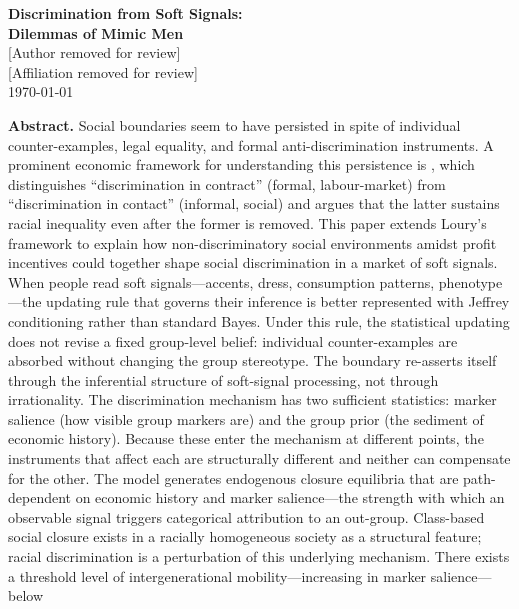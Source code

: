 \documentclass[12pt,a4paper]{article}
\theoremstyle{definition}
\numberwithin{proposition}{subsection}
\begin{document}
\begin{center}
{\LARGE\bfseries Discrimination from Soft Signals:\\[0.4em]
Dilemmas of Mimic Men}\\[1.5em]

{\large [Author removed for review]}\\[0.3em]
{\normalsize [Affiliation removed for review]}\\[1em]

{\normalsize \today}\\[1.5em]

\begin{minipage}{0.85\textwidth}
\small\noindent\textbf{Abstract.}
Social boundaries seem to have persisted in spite of individual
counter-examples, legal equality, and formal anti-discrimination
instruments. A prominent economic framework for understanding this
persistence is \citet{Loury2002}, which distinguishes
``discrimination in contract'' (formal, labour-market) from
``discrimination in contact'' (informal, social) and argues that
the latter sustains racial inequality even after the former is
removed. This paper extends Loury's framework to explain how
non-discriminatory social environments amidst profit incentives
could together shape social discrimination in a market of soft
signals.
When people read soft signals---accents, dress, consumption
patterns, phenotype---the updating rule that governs their
inference is better represented with Jeffrey conditioning rather
than standard Bayes. Under this rule, the statistical updating
does not revise a fixed group-level belief: individual
counter-examples are absorbed without changing the group
stereotype. The boundary re-asserts itself through the inferential
structure of soft-signal processing, not through irrationality.
The discrimination mechanism has two sufficient statistics: marker
salience (how visible group markers are) and the group prior (the
sediment of economic history). Because these enter the mechanism
at different points, the instruments that affect each are
structurally different and neither can compensate for the other.
The model generates endogenous closure equilibria that are
path-dependent on economic history and marker salience---the
strength with which an observable signal triggers categorical
attribution to an out-group. Class-based
social closure exists in a racially homogeneous society as a
structural feature; racial discrimination is a perturbation of this
underlying mechanism. There exists a threshold level of
intergenerational mobility---increasing in marker salience---below

\end{minipage}
\end{center}
\end{document}
